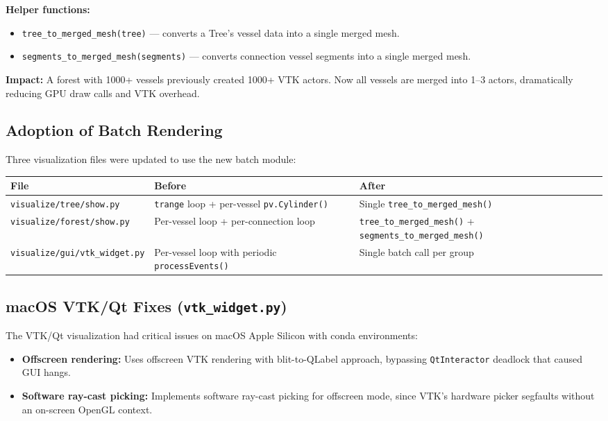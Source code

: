 \documentclass[11pt,a4paper]{article}
\begin{document}
\textbf{Helper functions:}
\begin{itemize}[nosep]
    \item \texttt{tree\_to\_merged\_mesh(tree)} --- converts a Tree's vessel data into a single merged mesh.
    \item \texttt{segments\_to\_merged\_mesh(segments)} --- converts connection vessel segments into a single merged mesh.
\end{itemize}

\textbf{Impact:} A forest with 1000+ vessels previously created 1000+ VTK actors. Now all vessels are merged into 1--3 actors, dramatically reducing GPU draw calls and VTK overhead.

\subsection{Adoption of Batch Rendering}

Three visualization files were updated to use the new batch module:

\begin{longtable}{p{4.5cm}p{4cm}p{3.5cm}}
\toprule
\textbf{File} & \textbf{Before} & \textbf{After} \\
\midrule
\endhead
\texttt{visualize/tree/show.py} & \texttt{trange} loop + per-vessel \texttt{pv.Cylinder()} & Single \texttt{tree\_to\_merged\_mesh()} \\
\texttt{visualize/forest/show.py} & Per-vessel loop + per-connection loop & \texttt{tree\_to\_merged\_mesh()} + \texttt{segments\_to\_merged\_mesh()} \\
\texttt{visualize/gui/vtk\_widget.py} & Per-vessel loop with periodic \texttt{processEvents()} & Single batch call per group \\
\bottomrule
\end{longtable}

\subsection{macOS VTK/Qt Fixes (\texttt{vtk\_widget.py})}

The VTK/Qt visualization had critical issues on macOS Apple Silicon with conda environments:
\begin{itemize}[nosep]
    \item \textbf{Offscreen rendering:} Uses offscreen VTK rendering with blit-to-QLabel approach, bypassing \texttt{QtInteractor} deadlock that caused GUI hangs.
    \item \textbf{Software ray-cast picking:} Implements software ray-cast picking for offscreen mode, since VTK's hardware picker segfaults without an on-screen OpenGL context.
\end{itemize}
\end{document}
